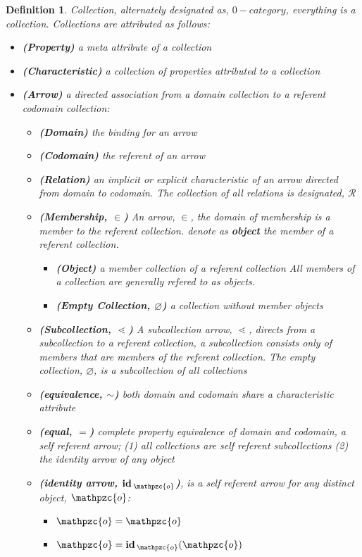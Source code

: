 \documentclass[aps,twocolumn,secnumarabic,nobalancelastpage,amsmath,amssymb,
amsthm,nofootinbib,parskip=full]{revtex4}
\numberwithin{equation}{section}
\newtheorem{definition}{Definition}[section]
\newcommand{\obk}[1]{\mathpzc{#1}}
\newcommand{\arrid}[1]{\oper{id}_{\obk{#1}}}
\newcommand{\oper}[1]{\mathbf{#1}\,}
\begin{document}
\begin{definition}{Collection}\label{def:collection},
  alternately designated as, $0-category$, everything is a collection.
  Collections are attributed as follows:
  \begin{itemize}
  \item\textbf{(Property)} a meta attribute of a collection
  \item\textbf{(Characteristic)} a collection of properties
    attributed to a collection
  \item\textbf{(Arrow)} a directed association from a domain
    collection to a referent codomain collection:
    \begin{itemize}
    \item\textbf{(Domain)} the binding for an arrow
    \item\textbf{(Codomain)} the referent of an arrow
    \item\textbf{(Relation)} an implicit or explicit
      characteristic of an arrow directed from domain to codomain.
      The collection of all relations is designated, $\mathcal{R}$
    \item\textbf{(Membership, $\in$)} An arrow, $\in$, the domain of
      membership is a member to the referent collection. denote as
      {\bf object} the member of a referent collection.
      \begin{itemize}
      \item\textbf{(Object)} a member collection of a referent collection
      All members of a collection are generally refered to as objects.
      \item\textbf{(Empty Collection, $\varnothing$)} a collection without
      member objects
      \end{itemize}
    \item\textbf{(Subcollection, $\lessdot$)} A subcollection
      arrow, $\lessdot$, directs from a subcollection to a referent collection,
      a subcollection consists only of members that are members of the
      referent collection. The empty collection, $\varnothing$, is a
      subcollection of all collections
    \item\textbf{(equivalence, $\sim$)} both domain and codomain
      share a characteristic attribute
    \item\textbf{(equal, $=$)} complete property equivalence of
      domain and codomain,
      a self referent arrow; (1) all collections are self
      referent subcollections (2) the identity arrow of any object
    \item\textbf{(identity arrow, $\arrid{o}$)}, is a self referent
      arrow for any distinct object, $\obk{o}$:
    \begin{itemize}
      \item $\obk{o}=\obk{o}$
      \item $\obk{o}=\arrid{o}(\obk{o})$
    \end{itemize}
    \end{itemize}
  \end{itemize}
\end{definition}
\end{document}
